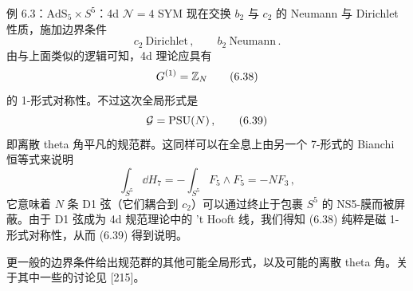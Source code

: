 \begin{examplebox}{例 6.3：$\mathrm{AdS}_5 \times S^5$：4d $\mathcal{N}=4$ SYM}
现在交换 $b_2$ 与 $c_2$ 的 Neumann 与 Dirichlet 性质，施加边界条件
\begin{equation}
  c_2\ \text{Dirichlet}\,,\qquad b_2\ \text{Neumann}\,. \tag{6.37}
\end{equation}
由与上面类似的逻辑可知，4d 理论应具有
\begin{equation}
  G^{(1)} = \mathbb{Z}_N \tag{6.38}
\end{equation}
的 1-形式对称性。不过这次全局形式是
\begin{equation}
  \mathcal{G} = \mathrm{PSU}(N)\,, \tag{6.39}
\end{equation}
即离散 theta 角平凡的规范群。这同样可以在全息上由另一个 7-形式的 Bianchi 恒等式来说明
\begin{equation}
  \int_{S^5} \dd H_7 = -\int_{S^5} F_5 \wedge F_5 = -N F_3\,, \tag{6.40}
\end{equation}
它意味着 $N$ 条 D1 弦（它们耦合到 $c_2$）可以通过终止于包裹 $S^5$ 的 NS5-膜而被屏蔽。由于 D1 弦成为 4d 规范理论中的 't Hooft 线，我们得知 (6.38) 纯粹是磁 1-形式对称性，从而 (6.39) 得到说明。


更一般的边界条件给出规范群的其他可能全局形式，以及可能的离散 theta 角。关于其中一些的讨论见 [215]。
\end{examplebox}

